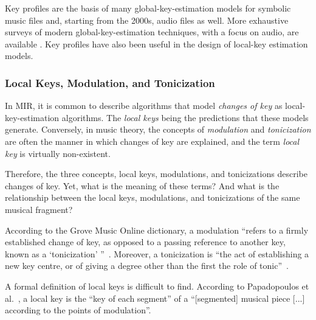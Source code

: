 
Key profiles are the basis of many global-key-estimation models for symbolic music files and, starting from the 2000s, audio files as well. More exhaustive surveys of modern global-key-estimation techniques, with a focus on audio, are available \cite{korzeniowski_harmonic_2018, campbell_automatic_2010}. Key profiles have also been useful in the design of local-key estimation models.

\subsubsection{Local Keys, Modulation, and Tonicization}\label{ssec:terminology}

In MIR, it is common to describe algorithms that model \emph{changes of key} as local-key-estimation algorithms.
The \emph{local keys} being the predictions that these models generate. Conversely, in music theory, the concepts of \emph{modulation} and \emph{tonicization} are often the manner in which changes of key are explained, and the term \emph{local key} is virtually non-existent.

Therefore, the three concepts, local keys, modulations, and tonicizations describe changes of key.
Yet, what is the meaning of these terms? And what is the relationship between the local keys, modulations, and tonicizations of the same musical fragment?

According to the Grove Music Online dictionary, a modulation ``refers to a firmly established change of key, as opposed to a passing reference to another key, known as a `tonicization' ''~\cite{saslawgrovemodulation}. Moreover, a tonicization is ``the act of establishing a new key centre, or of giving a degree other than the first the role of tonic''~\cite{drabkintonicization}.

A formal definition of local keys is difficult to find. According to Papadopoulos et al.~\cite{papadopoulos_local_2009}, a local key is the ``key of each segment'' of a ``[segmented] musical piece [...] according to the points of modulation''.

